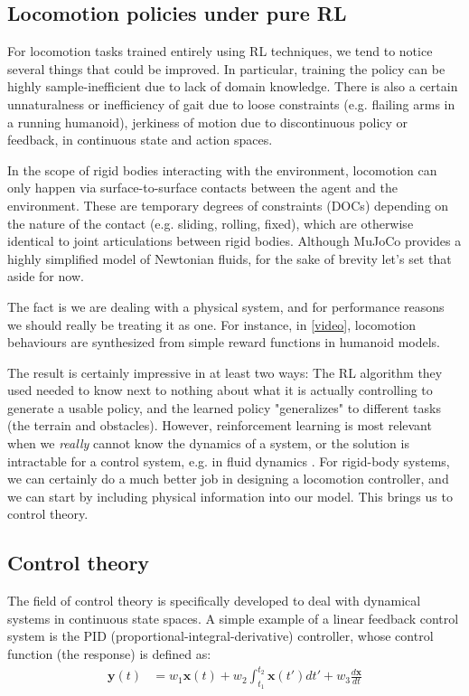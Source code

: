 \documentclass{article}
\newcommand{\bvec}[1]{\boldsymbol{#1}}
\begin{document}
\subsection{Locomotion policies under pure RL}
For locomotion tasks trained entirely using RL techniques, we tend to notice several things that could be improved. In particular, training the policy can be highly sample-inefficient due to lack of domain knowledge. There is also a certain unnaturalness or inefficiency of gait due to loose constraints (e.g. flailing arms in a running humanoid), jerkiness of motion due to discontinuous policy or feedback, in continuous state and action spaces.

In the scope of rigid bodies interacting with the environment, locomotion can only happen via surface-to-surface contacts between the agent and the environment. These are temporary degrees of constraints (DOCs) depending on the nature of the contact (e.g. sliding, rolling, fixed), which are otherwise identical to joint articulations between rigid bodies. Although MuJoCo provides a highly simplified model of Newtonian fluids, for the sake of brevity let's set that aside for now.

The fact is we are dealing with a physical system, and for performance reasons we should really be treating it as one. For instance, in \cite{heess2017emergence} [\href{https://www.youtube.com/watch?v=hx_bgoTF7bs}{video}], locomotion behaviours are synthesized from simple reward functions in humanoid models.

The result is certainly impressive in at least two ways: The RL algorithm they used needed to know next to nothing about what it is actually controlling to generate a usable policy, and the learned policy "generalizes" to different tasks (the terrain and obstacles). However, reinforcement learning is most relevant when we \textit{really} cannot know the dynamics of a system, or the solution is intractable for a control system, e.g. in fluid dynamics \cite{mit6832}. For rigid-body systems, we can certainly do a much better job in designing a locomotion controller, and we can start by including physical information into our model. This brings us to control theory.

\subsection{Control theory}
The field of control theory is specifically developed to deal with dynamical systems in continuous state spaces. A simple example of a linear feedback control system is the PID (proportional-integral-derivative) controller, whose control function (the response) is defined as:
\begin{align*}
\bvec{y}(t) &= w_1 \bvec{x}(t) + w_2\int_{t_1}^{t_2} \bvec{x}(t') dt' + w_3 \frac{d\bvec{x}}{dt}
\end{align*}
\end{document}
